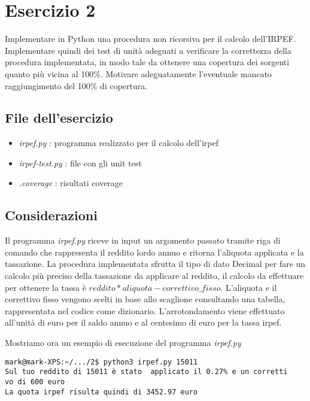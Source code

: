\documentclass{article}
\newcommand{\py}{Python }
\newcommand{\filename}[1]{\textit{#1}}
\begin{document}
\section{Esercizio 2}

\begin{consegna}
Implementare in \py una procedura non ricorsiva per il calcolo dell’IRPEF.
Implementare quindi dei test di unità adeguati a verificare la correttezza della procedura implementata, in modo tale da ottenere una copertura dei sorgenti quanto più vicina al 100\%. Motivare adeguatamente l’eventuale mancato raggiungimento del 100\% di copertura.
\end{consegna}

\subsection{File dell'esercizio}
\begin{itemize}
    \item \filename{irpef.py} : programma realizzato per il calcolo dell'irpef
    \item \filename{irpef-test.py} : file con gli unit test
    \item \filename{.coverage} : risultati coverage
\end{itemize}

\subsection{Considerazioni}
Il programma \filename{irpef.py} riceve in input un argomento passato tramite riga di comando che rappresenta il reddito lordo annuo e ritorna l'aliquota applicata e la tassazione. La procedura implementata sfrutta il tipo di dato Decimal per fare un calcolo più preciso della tassazione da applicare al reddito, il calcolo da effettuare per ottenere la tassa è $reddito * aliquota - correttivo\_fisso$. L'aliquota e il correttivo fisso vengono scelti in base allo scaglione consultando una tabella, rappresentata nel codice come dizionario. L'arrotondamento viene effettuato all'unità di euro per il saldo annuo e al centesimo di euro per la tassa irpef.

Mostriamo ora un esempio di esecuzione del programma \filename{irpef.py}
\begin{verbatim}
mark@mark-XPS:~/.../2$ python3 irpef.py 15011
Sul tuo reddito di 15011 è stato  applicato il 0.27% e un corretti
vo di 600 euro
La quota irpef risulta quindi di 3452.97 euro
\end{verbatim}
\end{document}
